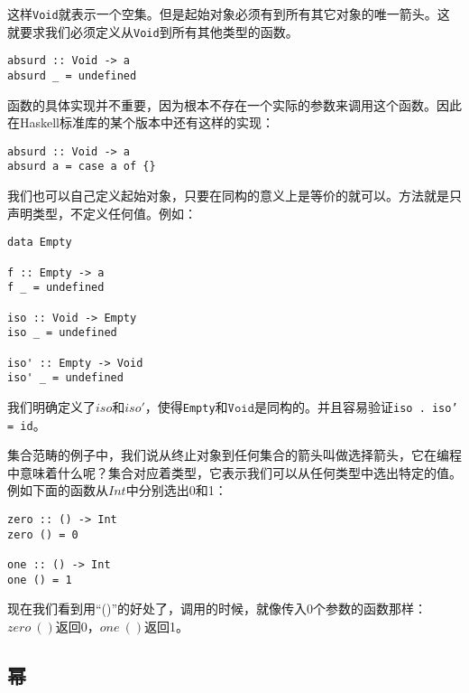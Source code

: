 \documentclass{article}
\begin{document}
\begin{example}
这样\texttt{Void}就表示一个空集。但是起始对象必须有到所有其它对象的唯一箭头。这就要求我们必须定义从\texttt{Void}到所有其他类型的函数。

\begin{lstlisting}
absurd :: Void -> a
absurd _ = undefined
\end{lstlisting}

函数的具体实现并不重要，因为根本不存在一个实际的参数来调用这个函数。因此在Haskell标准库的某个版本中还有这样的实现：

\begin{lstlisting}
absurd :: Void -> a
absurd a = case a of {}
\end{lstlisting}

我们也可以自己定义起始对象，只要在同构的意义上是等价的就可以。方法就是只声明类型，不定义任何值。例如：

\begin{lstlisting}
data Empty

f :: Empty -> a
f _ = undefined

iso :: Void -> Empty
iso _ = undefined

iso' :: Empty -> Void
iso' _ = undefined
\end{lstlisting}

我们明确定义了$iso$和$iso'$，使得\texttt{Empty}和$\texttt{Void}$是同构的。并且容易验证\texttt{iso . iso' = id}。

集合范畴的例子中，我们说从终止对象到任何集合的箭头叫做选择箭头，它在编程中意味着什么呢？集合对应着类型，它表示我们可以从任何类型中选出特定的值。例如下面的函数从$Int$中分别选出0和1：

\begin{lstlisting}
zero :: () -> Int
zero () = 0

one :: () -> Int
one () = 1
\end{lstlisting}

现在我们看到用“()”的好处了，调用的时候，就像传入0个参数的函数那样：$zero\ ()$返回0，$one\ ()$返回1。
\end{example}

\begin{Exercise}
\end{Exercise}

\subsection{幂}
\end{document}
